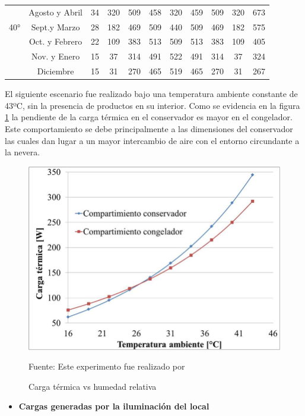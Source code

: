 \begin{itemize}
\begin{table}[H]
\begin{tabular}{@{}lcccccccccc@{}}
		& Agosto y Abril       & 34    & 320    & 509    & 458    & 320   & 459   & 509   & 320   & 673      \\
		\multicolumn{1}{c}{40°}           & Sept.y Marzo         & 28    & 182    & 469    & 509    & 440   & 509   & 469   & 182   & 575      \\
		& Oct. y Febrero       & 22    & 109    & 383    & 513    & 509   & 513   & 383   & 109   & 405      \\
		& Nov. y   Enero       & 15    & 37     & 314    & 491    & 522   & 491   & 314   & 37    & 324      \\
		& Diciembre            & 15    & 31     & 270    & 465    & 519   & 465   & 270   & 31    & 267      \\ \bottomrule
	\end{tabular}
\end{table}
	El siguiente escenario fue realizado bajo una temperatura ambiente constante de 43ºC, sin la presencia de productos en su interior. Como se evidencia en la figura \ref{fig:cargas-ter} la pendiente de la carga térmica en el conservador es mayor en el congelador. Este comportamiento se debe principalmente a las dimensiones del conservador las cuales dan lugar a un mayor intercambio de aire con el entorno circundante a la nevera.  \cite{rio}


\begin{figure}[H]
	\centering
	\includegraphics[width=0.46\linewidth]{figures/cargas-ter}
	\caption{Carga térmica vs humedad relativa}
	\label{fig:cargas-ter} Fuente: Este experimento fue realizado por 
\end{figure}




\label{table:carrier}
\begin{itemize}
	\item \textbf{Cargas generadas por la iluminación del local}
	

\end{itemize}
\end{itemize}

